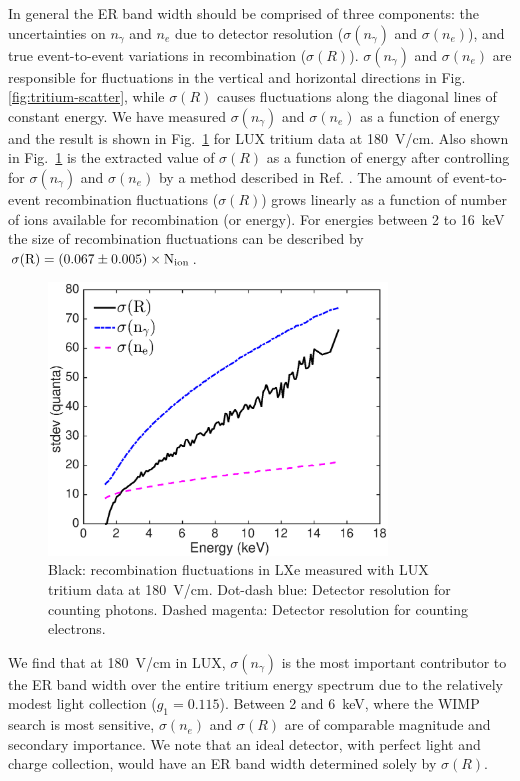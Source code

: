 In general the ER band width should be comprised of three components: the uncertainties on  $n_{\gamma}$ and $n_e$  due to detector resolution ($ \sigma(n_{\gamma})$ and $ \sigma(n_e)$), and true event-to-event variations in recombination ($ \sigma(R)$). $ \sigma(n_{\gamma})$ and $ \sigma(n_e)$ are responsible for fluctuations in the vertical  and horizontal directions in Fig. \ref{fig:tritium-scatter},  while $ \sigma(R)$ causes fluctuations along the diagonal lines of constant energy. We have measured $ \sigma(n_{\gamma})$ and $ \sigma(n_e)$ as a function of energy and the result is shown in Fig.~\ref{fig:recomb-flucs} for LUX tritium data at 180~V/cm\cite{Dobi_Thesis}. Also shown in Fig.~\ref{fig:recomb-flucs} is the extracted value of $ \sigma(R)$ as a function of energy after controlling for $ \sigma(n_{\gamma})$ and $ \sigma(n_e)$ by a method described in Ref. \cite{Dobi_Thesis}. The amount of event-to-event recombination fluctuations ($ \sigma(R)$) grows linearly as a function of number of ions available for recombination (or energy). For energies between 2 to 16~keV the size of recombination fluctuations can be described by $\rm \sigma(R)=(0.067\pm0.005) \times N_{ion}$.

\begin{figure}[h!]
\includegraphics[width=90mm]{fig/recomb_flucs.eps}
\caption{Black: recombination fluctuations in LXe measured with LUX tritium data at 180~V/cm. Dot-dash blue: Detector resolution for counting photons. Dashed magenta: Detector resolution for counting electrons.}
\label{fig:recomb-flucs}
\end{figure}

We find that at 180~V/cm in LUX, $ \sigma(n_{\gamma})$ is the most important contributor to the ER band width over the entire tritium energy spectrum due to the relatively modest light collection ($g_1 = 0.115$). Between 2 and 6~keV, where the WIMP search is most sensitive, $ \sigma(n_e)$ and $ \sigma(R)$ are of comparable magnitude and secondary importance. We note that an ideal detector, with perfect light and charge collection, would have an ER band width determined solely by $ \sigma(R)$. 

